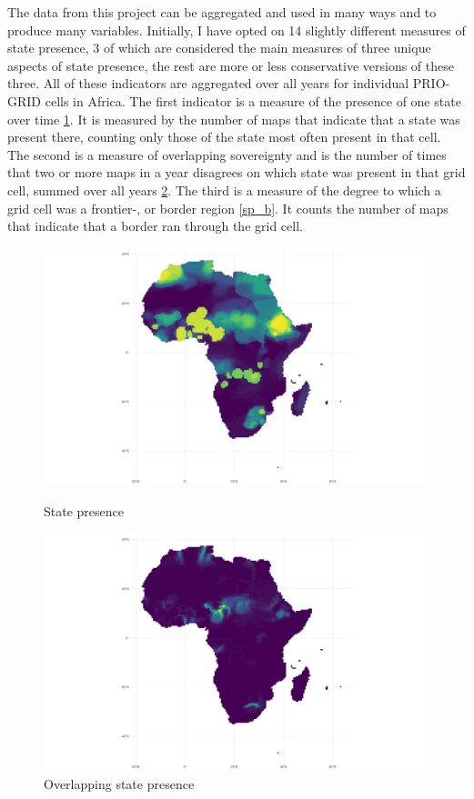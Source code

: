 \documentclass[12pt]{article}
\begin{document}
The data from this project can be aggregated and used in many ways and to
produce many variables. Initially, I have opted on 14 slightly different
measures of state presence, 3 of which are considered the main measures of three
unique aspects of state presence, the rest are more or less conservative
versions of these three. All of these indicators are aggregated over all years
for individual PRIO-GRID cells in Africa. The first indicator is a measure of
the presence of one state over time \ref{sp}. It is measured by the number of
maps that indicate that a state was present there, counting only those of the
state most often present in that cell. The second is a measure of overlapping
sovereignty and is the number of times that two or more maps in a year disagrees
on which state was present in that grid cell, summed over all years \ref{sp_o}.
The third is a measure of the degree to which a grid cell was a frontier-, or
border region \ref{sp_b}. It counts the number of maps that indicate that a
border ran through the grid cell.

\begin{figure}[!htb]
	\caption{State presence}
	\includegraphics[width=\textwidth,keepaspectratio]{sp_sum_i_any.pdf}
	\label{sp}
\end{figure}

\begin{figure}[!htb]
	\includegraphics[width=\textwidth,keepaspectratio]{sp_o.pdf}
	\caption{Overlapping state presence}
	\label{sp_o}
\end{figure}
\end{document}
